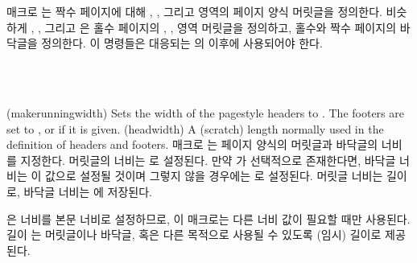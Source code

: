 매크로 \cmd{\makeevenhead}는 짝수 페이지에 대해 , ,
그리고  영역의  페이지 양식
머릿글을 정의한다.
비슷하게 \cmd{\makeoddhead}, \cmd{\makeevenfoot}, 그리고 \cmd{\makeoddfoot}은
홀수 페이지의 , ,  영역 
머릿글을 정의하고, 홀수와 짝수 페이지의
바닥글을 정의한다.
이  명령들은 대응되는 의 \cmd{\makepagestyle} 이후에
사용되어야 한다.

\begin{syntax}
\cmd{\makerunningwidth} \\
\lnc{\headwidth} \\
\end{syntax}
\glossary(makerunningwidth)%
  {}%
  {Sets the width of the  pagestyle headers to .
   The footers are set to , or  if it
   is given.}
\glossary(headwidth)%
  {}%
  {A (scratch) length normally used in the definition of headers and footers.}
매크로 \cmd{\makerunningwidth}는  페이지 양식의
머릿글과 바닥글의 너비를 지정한다.
머릿글의 너비는 로 설정된다.
만약 가 선택적으로 존재한다면, 바닥글 너비는 이 값으로 설정될
것이며 그렇지 않을 경우에는 로 설정된다.
머릿글 너비는 길이 로, 바닥글 너비는
에 저장된다.

\cmd{\makepagestyle}은 너비를 본문 너비로 설정하므로, 이 매크로는 다른 너비
값이 필요할 때만 사용된다.
길이 \lnc{\headwidth}는 머릿글이나
바닥글, 혹은 다른 목적으로 사용될 수 있도록 (임시) 길이로
제공된다.

